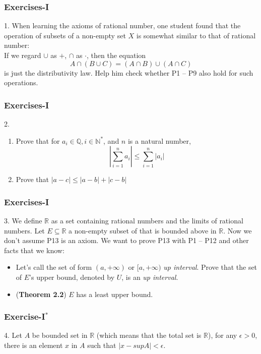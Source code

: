 \documentclass[12pt, t]{beamer}
\renewcommand{\emph}[1]{{\color{Turquoise3}\textsl{#1}}}
\begin{document}
\begin{frame}
    \frametitle{Exercises-I}
    1. When learning the axioms of rational number, one student found that the operation of subsets of a non-empty
    set $X$ is somewhat similar to that of rational number:\\
    \vspace{1em}
    If we regard $\cup$ as $+$, $\cap$ as $\cdot$, then the equation
    \begin{equation*}
        A\cap(B\cup C)=(A\cap B)\cup(A\cap C)
    \end{equation*}
    is just the distributivity law. Help him  check whether P1 -- P9 also hold for such operations.
\end{frame}

\begin{frame}
    \frametitle{Exercises-I}
    2.
    \begin{enumerate}
        \item Prove that for $a_i\in \mathbb{Q}, i\in \mathbb{N^*}$, and $n$ is a natural number,
              \begin{equation*}
                  |\sum^n_{i=1}a_i|\leq\sum^n_{i=1}|a_i|
              \end{equation*}
        \item Prove that $|a-c|\leq |a-b| +|c-b|$
    \end{enumerate}
\end{frame}

\begin{frame}
    \frametitle{Exercises-I}
    3. We define $\mathbb{R}$ as a set containing rational numbers and the limits of rational numbers.
    Let $E\subseteq \mathbb{R}$ a non-empty subset of that is bounded above in $\mathbb{R}$. Now we don't
    assume P13 is an axiom. We want to prove P13 with P1 -- P12 and other facts that we know:
    \begin{itemize}
        \item Let's call the set of form $(a,+\infty)$ or $[a,+\infty)$ \emph{up interval}. Prove that the
              set of $E$'s upper bound, denoted by $U$, is an \emph{up interval}.
        \item (\textbf{Theorem 2.2}) $E$ has a least upper bound.
    \end{itemize}
\end{frame}

\begin{frame}
    \frametitle{Exercise-I$^*$}
    4. Let $A$ be bounded set in $\mathbb{R}$ (which means that the total set is $\mathbb{R}$), for any $\epsilon>0$,
    there is an element $x$ in $A$ such that $|x-supA|<\epsilon$.
\end{frame}
\end{document}
